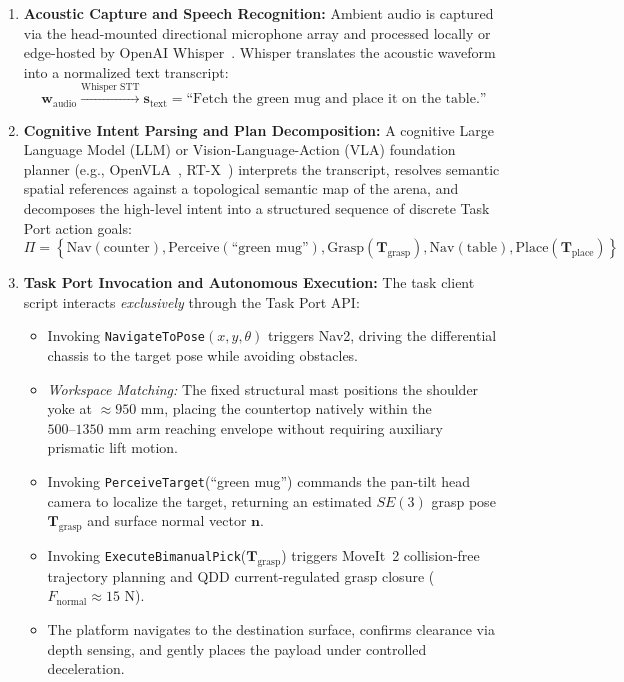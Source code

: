 \begin{enumerate}[leftmargin=1.5em]
  \item \textbf{Acoustic Capture and Speech Recognition:} Ambient audio is captured via the head-mounted directional microphone array and processed locally or edge-hosted by OpenAI Whisper~\cite{whisper}. Whisper translates the acoustic waveform into a normalized text transcript:
  \begin{equation}
  \mathbf{w}_{\text{audio}} \xrightarrow{\text{Whisper STT}} \mathbf{s}_{\text{text}} = \text{``Fetch the green mug and place it on the table.''}
  \end{equation}
  
  \item \textbf{Cognitive Intent Parsing and Plan Decomposition:} A cognitive Large Language Model (LLM) or Vision-Language-Action (VLA) foundation planner (e.g., OpenVLA~\cite{openvla}, RT-X~\cite{rtx}) interprets the transcript, resolves semantic spatial references against a topological semantic map of the arena, and decomposes the high-level intent into a structured sequence of discrete Task Port action goals:
  \begin{equation}
  \Pi = \left\{ \text{Nav}(\text{counter}), \text{Perceive}(\text{``green mug''}), \text{Grasp}(\mathbf{T}_{\text{grasp}}), \text{Nav}(\text{table}), \text{Place}(\mathbf{T}_{\text{place}}) \right\}
  \end{equation}

  \item \textbf{Task Port Invocation and Autonomous Execution:} The task client script interacts \emph{exclusively} through the Task Port API:
  \begin{itemize}
    \item Invoking \texttt{NavigateToPose}$(x, y, \theta)$ triggers Nav2, driving the differential chassis to the target pose while avoiding obstacles.
    \item \emph{Workspace Matching:} The fixed structural mast positions the shoulder yoke at $\approx 950\text{ mm}$, placing the countertop natively within the $500\text{--}1350\text{ mm}$ arm reaching envelope without requiring auxiliary prismatic lift motion.
    \item Invoking \texttt{PerceiveTarget}(``green mug'') commands the pan-tilt head camera to localize the target, returning an estimated $SE(3)$ grasp pose $\mathbf{T}_{\text{grasp}}$ and surface normal vector $\mathbf{n}$.
    \item Invoking \texttt{ExecuteBimanualPick}($\mathbf{T}_{\text{grasp}}$) triggers MoveIt~2 collision-free trajectory planning and QDD current-regulated grasp closure ($F_{\text{normal}} \approx 15\text{ N}$).
    \item The platform navigates to the destination surface, confirms clearance via depth sensing, and gently places the payload under controlled deceleration.
  \end{itemize}
  

\end{enumerate}

